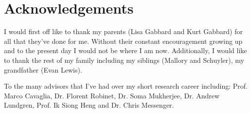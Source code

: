 \chapter{Acknowledgements}

I would first off like to thank my parents (Lisa Gabbard and Kurt Gabbard) for all that they've done for me. Without their constant encouragement growing up and to the present day I would not be where I am now. Additionally, I would like to thank the rest of my family including my siblings (Mallory and Schuyler), my grandfather (Evan Lewis). 

To the many advisors that I've had over my short research career including: Prof. Marco Cavaglia, Dr. Florent Robinet, Dr. Soma Mukherjee, Dr. Andrew Lundgren, Prof. Ik Siong Heng and Dr. Chris Messenger.
